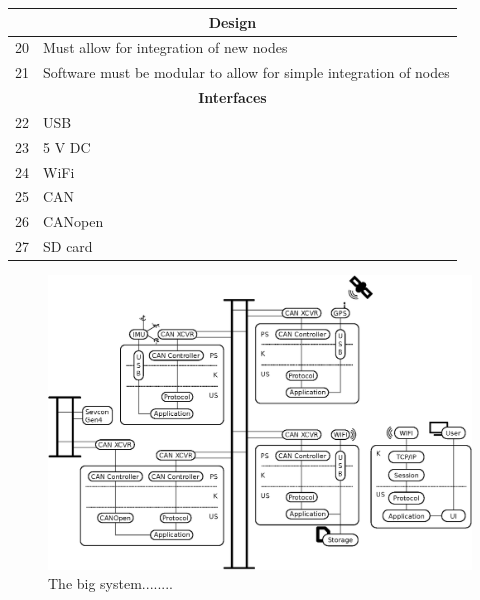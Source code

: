 \begin{table}[H]
\begin{tabular}{ |p{0.3cm}|p{10.5cm}| }
\hline
\multicolumn{2}{|c|}{\textbf{Design}}\\
\hline	
20 & Must allow for integration of new nodes		 					 \\
21 & Software must be modular to allow for simple integration of nodes	 \\

\hline
\multicolumn{2}{|c|}{\textbf{Interfaces}}\\
\hline	
22 & USB 		 						\\
23 & 5 V DC		 						\\
24 & WiFi	 							\\
25 & CAN 		 						\\
26 & CANopen 		 					\\
27 & SD card 		 					\\
\hline
\end{tabular}
\end{table}

\newpage
\begin{figure}[!h]
	\centering
	\includegraphics[angle=90,width=\textwidth]{graphics/analysis_complex.eps}
	\caption{The big system........}
	\label{fig:complete_system}
\end{figure}



